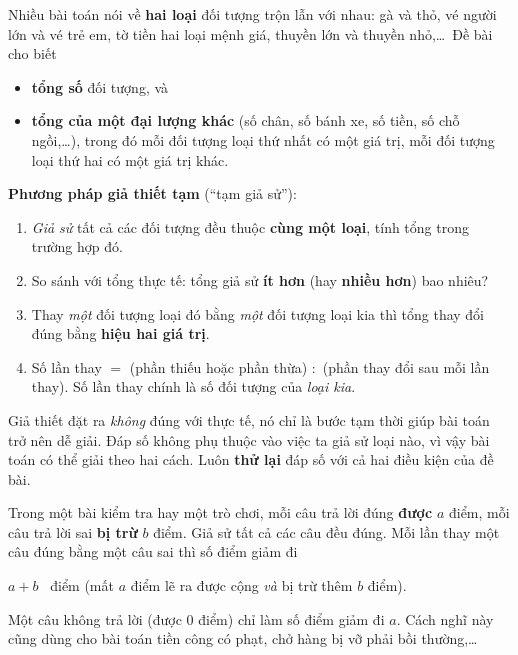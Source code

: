 \begin{knowbox}
Nhiều bài toán nói về \textbf{hai loại} đối tượng trộn lẫn với nhau: gà và thỏ, vé người lớn và vé trẻ em, tờ tiền hai loại mệnh giá, thuyền lớn và thuyền nhỏ,\ldots\ Đề bài cho biết
\begin{itemize}[leftmargin=1.4em,itemsep=3pt]
\item \textbf{tổng số} đối tượng, và
\item \textbf{tổng của một đại lượng khác} (số chân, số bánh xe, số tiền, số chỗ ngồi,\ldots), trong đó mỗi đối tượng loại thứ nhất có một giá trị, mỗi đối tượng loại thứ hai có một giá trị khác.
\end{itemize}
\textbf{Phương pháp giả thiết tạm} (``tạm giả sử''):
\begin{enumerate}[leftmargin=1.6em,itemsep=2pt]
\item \emph{Giả sử} tất cả các đối tượng đều thuộc \textbf{cùng một loại}, tính tổng trong trường hợp đó.
\item So sánh với tổng thực tế: tổng giả sử \textbf{ít hơn} (hay \textbf{nhiều hơn}) bao nhiêu?
\item Thay \emph{một} đối tượng loại đó bằng \emph{một} đối tượng loại kia thì tổng thay đổi đúng bằng \textbf{hiệu hai giá trị}.
\item Số lần thay $=$ (phần thiếu hoặc phần thừa) $:$ (phần thay đổi sau mỗi lần thay). Số lần thay chính là số đối tượng của \emph{loại kia}.
\end{enumerate}
Giả thiết đặt ra \emph{không} đúng với thực tế, nó chỉ là bước tạm thời giúp bài toán trở nên dễ giải. Đáp số không phụ thuộc vào việc ta giả sử loại nào, vì vậy bài toán có thể giải theo hai cách. Luôn \textbf{thử lại} đáp số với cả hai điều kiện của đề bài.
\end{knowbox}

\begin{knowbox}
Trong một bài kiểm tra hay một trò chơi, mỗi câu trả lời đúng \textbf{được} $a$ điểm, mỗi câu trả lời sai \textbf{bị trừ} $b$ điểm. Giả sử tất cả các câu đều đúng. Mỗi lần thay một câu đúng bằng một câu sai thì số điểm giảm đi
\begin{center}
$a+b$ \ điểm \quad (mất $a$ điểm lẽ ra được cộng \emph{và} bị trừ thêm $b$ điểm).
\end{center}
Một câu không trả lời (được $0$ điểm) chỉ làm số điểm giảm đi $a$. Cách nghĩ này cũng dùng cho bài toán tiền công có phạt, chở hàng bị vỡ phải bồi thường,\ldots
\end{knowbox}


